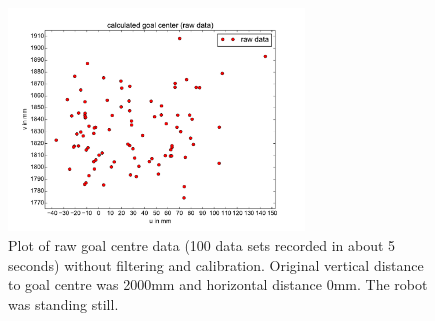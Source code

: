\documentclass[lnicst,a4paper]{svmultln}
\begin{document}
\begin{figure}
 	\centerline{\includegraphics[width=0.7\textwidth]{noise_data_plot.pdf}}
	{\caption{Plot of raw goal centre data (100 data sets recorded in about 5 seconds) without filtering and calibration. Original vertical distance to goal centre was 2000mm and horizontal distance 0mm. The robot was standing still.}
	\label{fig:noise1}}
\end{figure}
\end{document}

